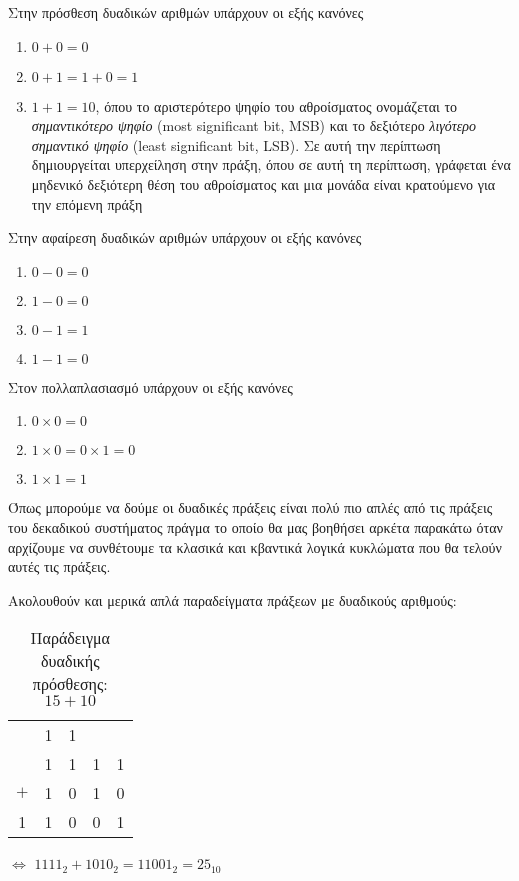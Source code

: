 Στην πρόσθεση δυαδικών αριθμών υπάρχουν οι εξής κανόνες

\begin{enumerate}
    \item $0 + 0 = 0$
    \item $0 + 1 = 1 + 0 = 1$
    \item $1 + 1 = 10$, όπου το αριστερότερο ψηφίο του αθροίσματος ονομάζεται το \textit{σημαντικότερο ψηφίο} (most significant bit, MSB) και
    το δεξιότερο \textit{λιγότερο σημαντικό ψηφίο} (least significant bit, LSB). Σε αυτή την περίπτωση δημιουργείται υπερχείληση στην πράξη,
    όπου σε αυτή τη περίπτωση, γράφεται ένα μηδενικό δεξιότερη θέση του αθροίσματος και μια μονάδα είναι κρατούμενο για την επόμενη πράξη
\end{enumerate}

Στην αφαίρεση δυαδικών αριθμών υπάρχουν οι εξής κανόνες

\begin{enumerate}
    \item $0 - 0 = 0$
    \item $1 - 0 = 0$
    \item $0 - 1 = 1$
    \item $1 - 1 = 0$
\end{enumerate}

Στον πολλαπλασιασμό υπάρχουν οι εξής κανόνες

\begin{enumerate}
    \item $0 \times 0 = 0$
    \item $1 \times 0 = 0 \times 1 = 0$
    \item $1 \times 1 = 1$
\end{enumerate}

Όπως μπορούμε να δούμε οι δυαδικές πράξεις είναι πολύ πιο απλές από τις πράξεις του δεκαδικού συστήματος
πράγμα το οποίο θα μας βοηθήσει αρκέτα παρακάτω όταν αρχίζουμε να συνθέτουμε τα κλασικά και κβαντικά λογικά 
κυκλώματα που θα τελούν αυτές τις πράξεις.

Ακολουθούν και μερικά απλά παραδείγματα πράξεων με δυαδικούς αριθμούς:

\begin{table}[ht]
    \centering
    \begin{tabular}{ccccc}
         & 1 & 1 &  &  \\
         & 1 & 1 & 1 & 1 \\
        $+$ & 1 & 0 & 1 & 0 \\
        \hline
        1 & 1 & 0 & 0 & 1 \\
    \end{tabular}
    \hspace{1cm}
    $\Longleftrightarrow $
    \hspace{1cm}
    $1111_2 + 1010_2 = 11001_2 = 25_{10}$
    \caption{Παράδειγμα δυαδικής πρόσθεσης: $15 + 10$}
\end{table}

